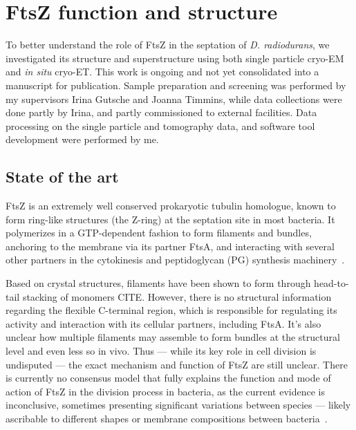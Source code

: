 \section{FtsZ function and structure}\label{ftsz}

To better understand the role of FtsZ in the septation of \textit{D. radiodurans}, we investigated its structure and superstructure using both single particle cryo-EM and \textit{in situ} cryo-ET.
This work is ongoing and not yet consolidated into a manuscript for publication.
Sample preparation and screening was performed by my supervisors Irina Gutsche and Joanna Timmins, while data collections were done partly by Irina, and partly commissioned to external facilities.
Data processing on the single particle and tomography data, and software tool development were performed by me.

\subsection{State of the art}

FtsZ is an extremely well conserved prokaryotic tubulin homologue, known to form ring-like structures (the Z-ring) at the septation site in most bacteria.
It polymerizes in a GTP-dependent fashion to form filaments and bundles, anchoring to the membrane via its partner FtsA, and interacting with several other partners in the cytokinesis and peptidoglycan (PG) synthesis machinery~\cite{barrowsFtsZDynamicsBacterial2021,mcquillenInsightsStructureFunction2020}.

Based on crystal structures, filaments have been shown to form through head-to-tail stacking of monomers CITE.
However, there is no structural information regarding the flexible C-terminal region, which is responsible for regulating its activity and interaction with its cellular partners, including FtsA.
It's also unclear how multiple filaments may assemble to form bundles at the structural level and even less so in vivo.
Thus --- while its key role in cell division is undisputed --- the exact mechanism and function of FtsZ are still unclear.
There is currently no consensus model that fully explains the function and mode of action of FtsZ in the division process in bacteria, as the current evidence is inconclusive, sometimes presenting significant variations between species --- likely ascribable to different shapes or membrane compositions between bacteria~\cite{barrowsFtsZDynamicsBacterial2021,mcquillenInsightsStructureFunction2020}.

